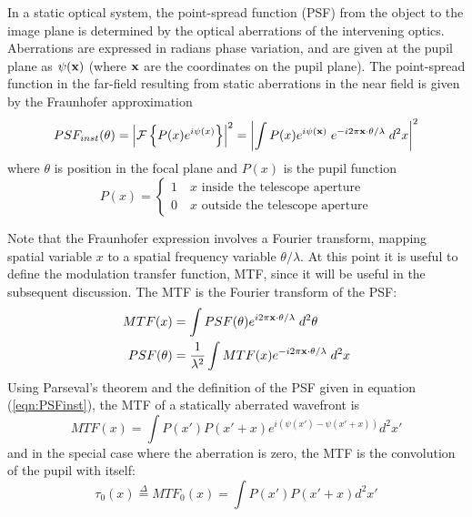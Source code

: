 \documentclass[11pt, oneside]{article}   	%
\begin{document}
In a static optical system, the point-spread function (PSF) from the object to the image plane is determined by the optical aberrations of the intervening optics. Aberrations are expressed in radians phase variation, and are given at the pupil plane as $\psi({\bf x})$ (where ${\bf x}$ are the coordinates on the pupil plane). The point-spread function in the far-field resulting from static aberrations in the near field is given by the Fraunhofer approximation
\begin{equation}
\label{eqn:PSFinst}
PSF_{inst}(\theta) = \left|{\cal F} \left\{ P(x) e^{i \psi(x)} \right\}\right|^2 = \left| \int{P(x) e^{i \psi({\bf x})}\; e^{-i 2 \pi {\bf x} \cdot {\bf \theta} / \lambda}\; d^2 x} \right|^2
\end{equation}
where $\theta$ is position in the focal plane and $P(x)$ is the pupil function
\begin{equation}
P(x) = \begin{cases}
                      1 \quad \text {$x$ inside the telescope aperture} \\
                      0 \quad \text {$x$ outside the telescope aperture}
           \end{cases}
\end{equation}

Note that the Fraunhofer expression involves a Fourier transform, mapping spatial variable $x$ to a spatial frequency variable $\theta/\lambda$. At this point it is useful to define the modulation transfer function, MTF, since it will be useful in the subsequent discussion. The MTF is the Fourier transform of the PSF:
\begin{align}
MTF(x) &= \int PSF(\theta) e^{i2\pi {\bf x} \cdot \theta / \lambda} \; d^2 \theta \\
PSF(\theta) &= \frac{1}{\lambda^2} \int MTF(x) e^{-i2\pi {\bf x} \cdot \theta / \lambda} \; d^2 x
\end{align}
Using Parseval's theorem and the definition of the PSF given in equation (\ref{eqn:PSFinst}), the MTF of a statically aberrated wavefront is
\begin{equation}
MTF(x) = \int P(x') P(x'+x) e^{i (\psi(x') - \psi(x'+x))} d^2 x'
\end{equation}
and in the special case where the aberration is zero, the MTF is the convolution of the pupil with itself:
\begin{equation}
\label{eqn:MTF0}
\tau_0(x) \overset{\Delta}{=}  MTF_0(x) = \int P(x') P(x'+x) d^2 x'
\end{equation}
\end{document}
